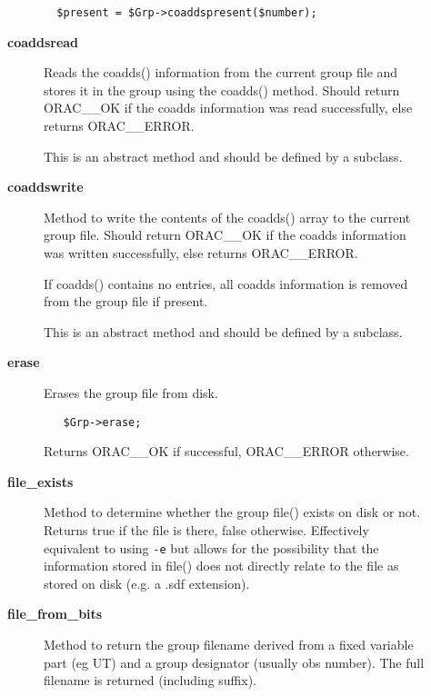 \begin{description}
\begin{description}
\begin{verbatim}
  $present = $Grp->coaddspresent($number);
\end{verbatim}

\item[{\textbf{coaddsread}}] \mbox{}

Reads the coadds() information from the current group file and stores
it in the group using the coadds() method.
Should return ORAC\_\_OK if the coadds information was read successfully,
else returns ORAC\_\_ERROR.



This is an abstract method and should be defined by a subclass.


\item[{\textbf{coaddswrite}}] \mbox{}

Method to write the contents of the coadds() array to the current
group file. Should return ORAC\_\_OK if the coadds information was written
successfully, else returns ORAC\_\_ERROR.



If coadds() contains no entries, all coadds information is removed from
the group file if present.



This is an abstract method and should be defined by a subclass.


\item[{\textbf{erase}}] \mbox{}

Erases the group file from disk.

\begin{verbatim}
   $Grp->erase;
\end{verbatim}


Returns ORAC\_\_OK if successful, ORAC\_\_ERROR otherwise.


\item[{\textbf{file\_exists}}] \mbox{}

Method to determine whether the group file() exists on disk or not.
Returns true if the file is there, false otherwise. Effectively
equivalent to using \texttt{-e} but allows for the possibility that the
information stored in file() does not directly relate to the
file as stored on disk (e.g. a .sdf extension).


\item[{\textbf{file\_from\_bits}}] \mbox{}

Method to return the group filename derived from a fixed
variable part (eg UT) and a group designator (usually obs
number). The full filename is returned (including suffix).


\end{description}
\end{description}
